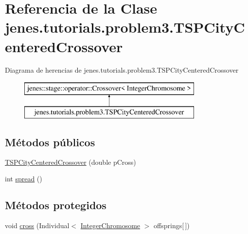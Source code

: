 \hypertarget{classjenes_1_1tutorials_1_1problem3_1_1_t_s_p_city_centered_crossover}{\section{Referencia de la Clase jenes.\-tutorials.\-problem3.\-T\-S\-P\-City\-Centered\-Crossover}
\label{classjenes_1_1tutorials_1_1problem3_1_1_t_s_p_city_centered_crossover}
}
Diagrama de herencias de jenes.\-tutorials.\-problem3.\-T\-S\-P\-City\-Centered\-Crossover\begin{figure}[H]
\begin{center}
\leavevmode
\includegraphics[height=2.000000cm]{classjenes_1_1tutorials_1_1problem3_1_1_t_s_p_city_centered_crossover}
\end{center}
\end{figure}
\subsection*{Métodos públicos}
\begin{DoxyCompactItemize}
\item 
\hyperlink{classjenes_1_1tutorials_1_1problem3_1_1_t_s_p_city_centered_crossover_a1609c37822bff6e6af8cb82082d8cd9d}{T\-S\-P\-City\-Centered\-Crossover} (double p\-Cross)
\item 
int \hyperlink{classjenes_1_1tutorials_1_1problem3_1_1_t_s_p_city_centered_crossover_a3a5e0f99396f1fb6dc89981969d58c13}{spread} ()
\end{DoxyCompactItemize}
\subsection*{Métodos protegidos}
\begin{DoxyCompactItemize}
\item 
void \hyperlink{classjenes_1_1tutorials_1_1problem3_1_1_t_s_p_city_centered_crossover_aeb7cb2d42aeeea2cb008f98d63b64805}{cross} (Individual$<$ \hyperlink{classjenes_1_1chromosome_1_1_integer_chromosome}{Integer\-Chromosome} $>$ offsprings\mbox{[}$\,$\mbox{]})
\end{DoxyCompactItemize}


